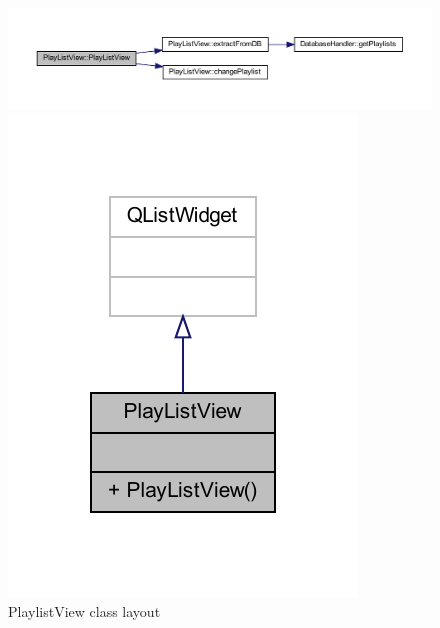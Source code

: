 \documentclass{article}
\begin{document}
\begin{figure}
    \begin{sideways}
        \centering
        \includegraphics[width=\textheight]{classPdfs/classPlayListView_ac84c4c57fc29e6b775c2bc8bc5fed55e_cgraph.pdf} 
    \end{sideways}
    \includegraphics[]{classPdfs/classPlayListView.pdf}
    \caption{PlaylistView class layout} \label{fig:PlaylistView class layout}
\end{figure}
\end{document}
